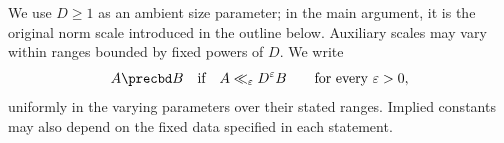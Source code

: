 We use $D\ge1$ as an ambient size parameter; in the main argument, it is the original norm scale introduced
in the outline below. Auxiliary scales may vary within ranges bounded by fixed powers of $D$. We write
\[
A\precbd B \quad\text{if}\quad A\ll_\varepsilon D^\varepsilon B
\qquad\text{for every }\varepsilon>0,
\]
uniformly in the varying parameters over their stated ranges. Implied constants may also depend on the fixed data specified in each statement.

